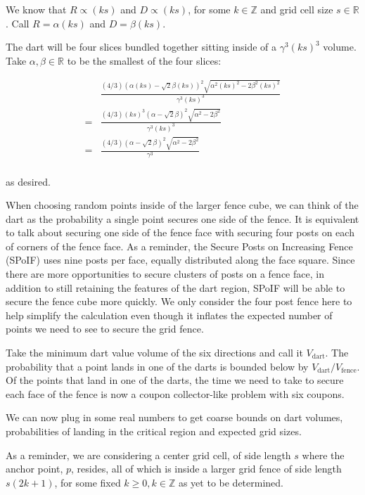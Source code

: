 \documentclass[a4paper,fleqn]{cas-dc}
\begin{document}
We know that $R \propto (k s)$
and $D \propto (k s)$, for some $k \in \mathbb{Z}$ and grid cell size $s \in \mathbb{R}$.
Call $R = \alpha (k s)$ and $D = \beta (k s)$.

The dart will be four slices bundled together sitting inside of a $\gamma^3 (k s)^3$ volume.
Take $\alpha, \beta \in \mathbb{R}$ to be the smallest of the four slices:

$$
\begin{array}{ll}
  & \frac{ (4/3) (\alpha (k s) - \sqrt{2} \beta (k s))^2 \sqrt{ \alpha^2 (k s)^2 - 2 \beta^2 (k s)^2 } }{ \gamma^3 (k s)^3 } \\[10pt]
  = & \frac{ (4/3) (k s)^3 (\alpha - \sqrt{2} \beta )^2  \sqrt{ \alpha^2 - 2 \beta^2 } }{ \gamma^3 (k s)^3 } \\[10pt]
  = & \frac{ (4/3) (\alpha - \sqrt{2} \beta )^2  \sqrt{ \alpha^2 - 2 \beta^2 } }{ \gamma^3 } \\[10pt]
\end{array}
$$

as desired.

When choosing random points inside of the larger fence cube, we can think of the dart as the probability
a single point secures one side of the fence.
It is equivalent to talk about securing one side of the fence face with securing four posts on each of corners of
the fence face.
As a reminder, the Secure Posts on Increasing Fence (SPoIF) uses nine posts per face, equally distributed
along the face square.
Since there are more opportunities to secure clusters of posts on a fence face,
in addition to still retaining the features of the dart region, SPoIF will be able to secure the fence cube
more quickly.
We only consider the four post fence here to help simplify the calculation even though it inflates the expected
number of points we need to see to secure the grid fence.

Take the minimum dart value volume of the six directions and call it $V _ {\text{dart}}$.
The probability that a point lands in one of the darts is bounded below by $V _ {\text{dart}} / V _ {\text{fence}}$.
Of the points that land in one of the darts, the time we need to take to secure each face of the fence is now
a coupon collector-like problem with six coupons.

We can now plug in some real numbers to get coarse bounds on dart volumes, probabilities of landing in the critical region
and expected grid sizes.

As a reminder, we are considering a center grid cell, of side length $s$ where the anchor point, $p$,
resides, all of which is inside a larger grid fence of side length $s(2k+1)$, for some fixed $k \ge 0, k \in \mathbb{Z}$
as yet to be determined.
\end{document}
